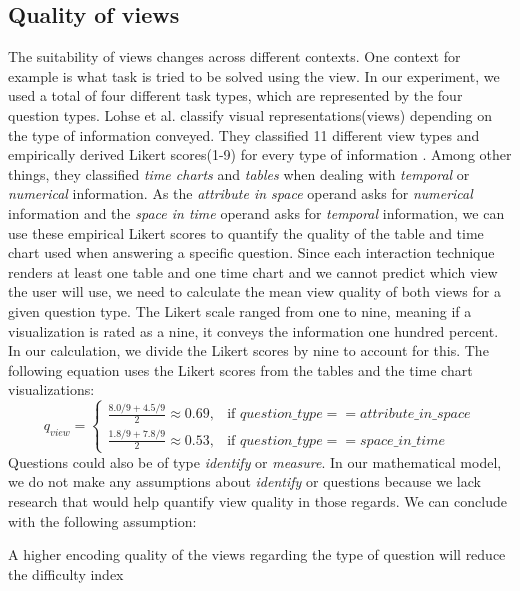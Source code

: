 \subsection{Quality of views}
The suitability of views changes across different contexts. One context for example is what task is tried to be solved
using the view. In our experiment, we used a total of four different task types, which are represented by the four question
types. Lohse et al. classify visual representations(views)
depending on the type of information conveyed. They classified 11 different view types and empirically derived Likert
scores(1-9) for every type of information \citep*{Lohse.1994}. Among other things, they classified \textit{time charts} and 
\textit{tables} when dealing with \textit{temporal} or \textit{numerical} information. As the \textit{attribute in space} operand
asks for \textit{numerical} information and the \textit{space in time} operand asks for \textit{temporal} information, we can 
use these empirical Likert scores to quantify the quality of the table and time chart used when answering a specific question.
Since each interaction technique renders at least one table and one time chart and we cannot predict which view the user will use, we
need to calculate the mean view quality of both views for a given question type. The Likert scale ranged from one to nine, meaning if a
visualization is rated as a nine, it conveys the information one hundred percent. In our calculation, we divide the Likert scores by nine to account
for this. The following equation uses the Likert scores from the tables and the time chart visualizations:
\begin{equation} \label{qualityViewEquation}
    q_{view}= 
    \begin{cases}
        \frac{8.0 / 9 + 4.5 / 9}{2} \approx 0.69,& \text{if } question\_type == attribute\_in\_space \\
        \frac{1.8 / 9 + 7.8 / 9}{2} \approx 0.53,& \text{if } question\_type == space\_in\_time 
    \end{cases}
\end{equation}
Questions could also be of type \textit{identify} or \textit{measure}.
In our mathematical model, we do not make any assumptions about \textit{identify} or  questions because we lack research that
would help quantify view quality in those regards. We can conclude with the following assumption:
\begin{statements}[resume]
    \item A higher encoding quality of the views regarding the type of question will reduce the difficulty index
\end{statements}
